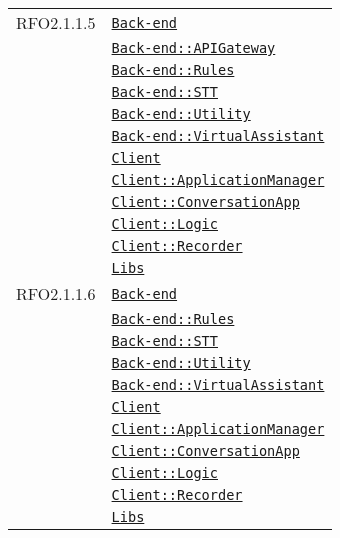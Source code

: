 \begin{longtable}{|>{\centering}m{3cm}|m{10cm}<{\centering}|}
RFO2.1.1.5 & \hyperref[Back-end]{\texttt{Back-end}}\\
& \hyperref[Back-end::APIGateway]{\texttt{Back-end::APIGateway}}\\
& \hyperref[Back-end::Rules]{\texttt{Back-end::Rules}}\\
& \hyperref[Back-end::STT]{\texttt{Back-end::STT}}\\
& \hyperref[Back-end::Utility]{\texttt{Back-end::Utility}}\\
& \hyperref[Back-end::VirtualAssistant]{\texttt{Back-end::VirtualAssistant}}\\
& \hyperref[Client]{\texttt{Client}}\\
& \hyperref[Client::ApplicationManager]{\texttt{Client::ApplicationManager}}\\
& \hyperref[Client::ConversationApp]{\texttt{Client::ConversationApp}}\\
& \hyperref[Client::Logic]{\texttt{Client::Logic}}\\
& \hyperref[Client::Recorder]{\texttt{Client::Recorder}}\\
& \hyperref[Libs]{\texttt{Libs}}\\ \hline

RFO2.1.1.6 & \hyperref[Back-end]{\texttt{Back-end}}\\
& \hyperref[Back-end::Rules]{\texttt{Back-end::Rules}}\\
& \hyperref[Back-end::STT]{\texttt{Back-end::STT}}\\
& \hyperref[Back-end::Utility]{\texttt{Back-end::Utility}}\\
& \hyperref[Back-end::VirtualAssistant]{\texttt{Back-end::VirtualAssistant}}\\
& \hyperref[Client]{\texttt{Client}}\\
& \hyperref[Client::ApplicationManager]{\texttt{Client::ApplicationManager}}\\
& \hyperref[Client::ConversationApp]{\texttt{Client::ConversationApp}}\\
& \hyperref[Client::Logic]{\texttt{Client::Logic}}\\
& \hyperref[Client::Recorder]{\texttt{Client::Recorder}}\\
& \hyperref[Libs]{\texttt{Libs}}\\ \hline


\end{longtable}

